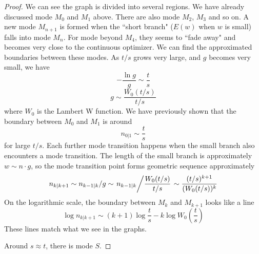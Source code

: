 \documentclass[]{article}
\begin{document}
\begin{proof}
	We can see the graph is divided into several regions. We have already discussed mode $M_0$ and $M_1$ above. There are also mode $M_2$, $M_3$ and so on. A new mode $M_{n+1}$ is formed when the ``short branch" ($E(w)$ when $w$ is small) falls into mode $M_n$. For mode beyond $M_4$, they seems to ``fade away" and becomes very close to the continuous optimizer. We can find the approximated boundaries between these modes. As $t/s$ grows very large, and $g$ becomes very small, we have
	\[
		-\frac{\ln g}{g}\sim \frac{t}{s}
	\]
	\[
		g \sim \frac{W_0(t/s)}{t/s}
	\]
	where $W_0$ is the Lambert W function. We have previously shown that the boundary between $M_0$ and $M_1$ is around
	\[
		n_{0|1}\sim \frac{t}{s}
	\]
	for large $t/s$. Each further mode transition happens when the small branch also encounters a mode transition. The length of the small branch is approximately $w \sim n\cdot g$, so the mode transition point forms geometric sequence approximately
	\[
		n_{k| k+1} \sim n_{k-1| k}/g \sim \left.n_{k-1| k}\middle/\frac{W_0(t/s)}{t/s}\right. \sim \frac{(t/s)^{k+1}}{(W_0(t/s))^{k}}
	\]
	On the logarithmic scale, the boundary between $M_k$ and $M_{k+1}$ looks like a line 
	\[
		\log n_{k| k+1} \sim (k + 1) \log\frac{t}{s} - k\log W_0\left(\frac{t}{s}\right)
	\]
	These lines match what we see in the graphs.
	
	Around $s \approx t$, there is mode $S$.
\end{proof}
\end{document}
